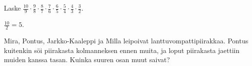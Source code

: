 \begin{tehtavasivu}
        \begin{tehtava}
            \begin{vastaus}		
            \end{vastaus}
        \end{tehtava}
        
        \begin{tehtava} 
            \begin{vastaus}		
            \end{vastaus}
        \end{tehtava}
        
        \begin{tehtava}
	\begin{vastaus}
	\end{vastaus}
\end{tehtava}

\begin{tehtava}
    Laske 
    $\frac{10}{9}\cdot \frac{9}{8}\cdot \frac{8}{7}\cdot \frac{7}{6}\cdot \frac{6}{5}
    \cdot \frac{5}{4}\cdot \frac{4}{3}\cdot \frac{3}{2}$.
    \begin{vastaus}
		$\frac{10}{2}=5$.
    \end{vastaus}        
\end{tehtava}
    
    \begin{tehtava}
        Mira, Pontus, Jarkko-Kaaleppi ja Milla leipoivat lanttuvompattipiirakkaa.
        Pontus kuitenkin söi piirakasta kolmanneksen ennen muita, ja loput piirakasta
        jaettiin muiden kanssa tasan. Kuinka suuren osan muut saivat?
        

\end{tehtava}
\end{tehtavasivu}
